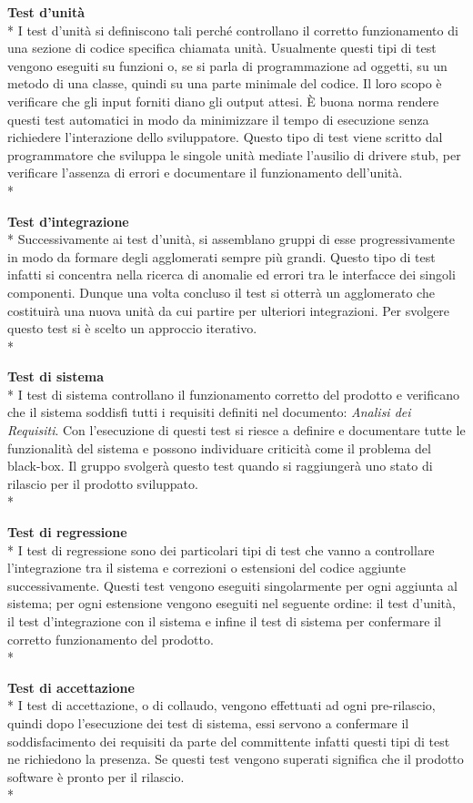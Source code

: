 				\textbf{Test d'unità} \\*
				I test d'unità si definiscono tali perché controllano il corretto funzionamento di una sezione di codice specifica chiamata unità. Usualmente questi tipi di test vengono eseguiti su funzioni o, se si parla di programmazione ad oggetti, su un metodo di una classe, quindi su una parte minimale del codice. Il loro scopo è verificare che gli input forniti diano gli output attesi. È buona norma rendere questi test automatici in modo da minimizzare il tempo di esecuzione senza richiedere l'interazione dello sviluppatore. Questo tipo di test viene scritto dal programmatore che sviluppa le singole unità mediate l'ausilio di driver\glosp e stub\glo, per verificare l'assenza di errori e documentare il funzionamento dell'unità. \\*
				
				
				\textbf{Test d'integrazione} \\*
				Successivamente ai test d'unità, si assemblano gruppi di esse progressivamente in modo da formare degli agglomerati sempre più grandi. Questo tipo di test infatti si concentra nella ricerca di anomalie ed errori tra le interfacce dei singoli componenti. Dunque una volta concluso il test si otterrà un agglomerato che costituirà una nuova unità da cui partire per ulteriori integrazioni. Per svolgere questo test si è scelto un approccio iterativo. \\*
				
				\textbf{Test di sistema} \\*
				I test di sistema controllano il funzionamento corretto del prodotto e verificano che il sistema soddisfi tutti i requisiti definiti nel documento: \textit{Analisi dei Requisiti}. Con l'esecuzione di questi test si riesce a definire e documentare tutte le funzionalità del sistema e possono individuare criticità come il problema del black-box\glo. Il gruppo svolgerà questo test quando si raggiungerà uno stato di rilascio per il prodotto sviluppato.
				\\*
				
				\textbf{Test di regressione} \\*
				I test di regressione sono dei particolari tipi di test che vanno a controllare l'integrazione tra il sistema e correzioni o estensioni del codice aggiunte successivamente. Questi test vengono eseguiti singolarmente per ogni aggiunta al sistema; per ogni estensione vengono eseguiti nel seguente ordine: il test d'unità, il test d'integrazione con il sistema e infine il test di sistema per confermare il corretto funzionamento del prodotto. \\*
				
				\textbf{Test di accettazione} \\*
				I test di accettazione, o di collaudo, vengono effettuati ad ogni pre-rilascio, quindi dopo l'esecuzione dei test di sistema, essi servono a confermare il soddisfacimento dei requisiti da parte del committente infatti questi tipi di test ne richiedono la presenza. Se questi test vengono superati significa che il prodotto software è pronto per il rilascio. \\*